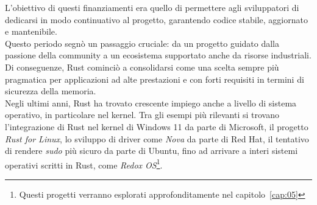 L'obiettivo di questi finanziamenti era quello di permettere agli sviluppatori di dedicarsi in modo continuativo al progetto, garantendo
codice stabile, aggiornato e mantenibile. \hfill
\vspace{10pt}\\
\noindent Questo periodo segnò un passaggio cruciale: da un progetto guidato dalla passione della community a un ecosistema supportato anche
da risorse industriali. Di conseguenze, Rust cominciò a consolidarsi come una scelta sempre più pragmatica per applicazioni 
ad alte prestazioni e con forti requisiti in termini di sicurezza della memoria. \hfill
\vspace{15pt}\\
\noindent Negli ultimi anni, Rust ha trovato crescente impiego anche a livello di sistema operativo, in particolare nel kernel.
Tra gli esempi più rilevanti si trovano l'integrazione di Rust nel kernel di Windows 11 da parte di Microsoft,
il progetto \textit{Rust for Linux}, lo sviluppo di driver come \textit{Nova} da parte di Red Hat, il tentativo di rendere
\textit{sudo} più sicuro da parte di Ubuntu, fino ad arrivare a interi sistemi operativi scritti in Rust, come \textit{Redox OS}\footnote{Questi progetti verranno esplorati approfonditamente nel capitolo~\ref{cap:05}}.